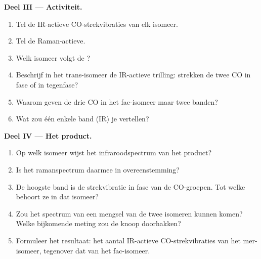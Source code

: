 \begin{problem}
\medskip\noindent\textbf{Deel III --- Activiteit.}
\begin{enumerate}[resume]
  \item Tel de IR-actieve CO-strekvibraties van elk isomeer.
  \item Tel de Raman-actieve.
  \item Welk isomeer volgt de ?
  \item Beschrijf in het trans-isomeer de IR-actieve trilling: strekken de
        twee CO in fase of in tegenfase?
  \item Waarom geven de drie CO in het fac-isomeer maar twee banden?
  \item Wat zou één enkele band (IR) je vertellen?
\end{enumerate}

\medskip\noindent\textbf{Deel IV --- Het product.}
\begin{enumerate}[resume]
  \item Op welk isomeer wijst het infraroodspectrum van het product?
  \item Is het ramanspectrum daarmee in overeenstemming?
  \item De hoogste band is de strekvibratie in fase van de CO-groepen. Tot
        welke  behoort ze in dat isomeer?
  \item Zou het spectrum van een mengsel van de twee isomeren kunnen komen?
        Welke bijkomende meting zou de knoop doorhakken?
  \item Formuleer het resultaat: het aantal IR-actieve CO-strekvibraties
        van het mer-isomeer, tegenover dat van het fac-isomeer.
\end{enumerate}
\end{problem}
